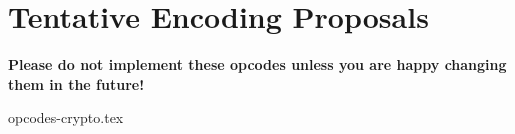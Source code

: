 %
%
%


\newpage
\section{Tentative Encoding Proposals}

{\bf Please do not implement these opcodes unless you are happy changing
them in the future!}
\medskip

{opcodes-crypto.tex}


\newpage

